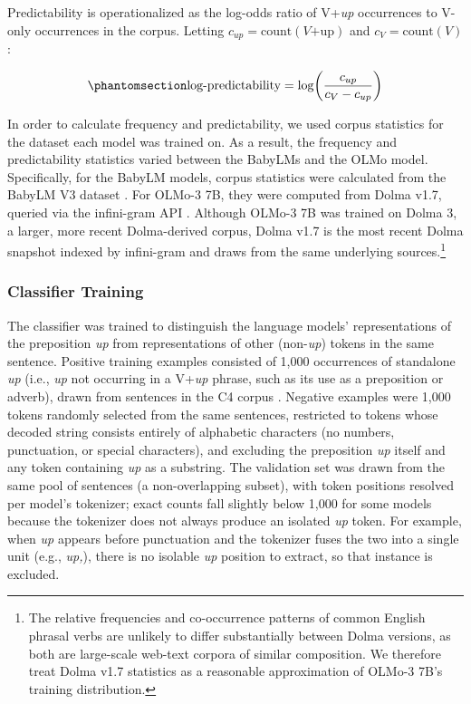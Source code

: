 \documentclass[11pt]{article}
\begin{document}
Predictability is operationalized as the log-odds ratio of V+\emph{up}
occurrences to V-only occurrences in the corpus. Letting
\(c_{up} = \text{count}(V\text{+up})\) and \(c_V = \text{count}(V)\):

\begin{equation}\phantomsection\label{eq-logit-predic}{\text{log-predictability} = \log\!\left(\frac{c_{up}}{c_V - c_{up}}\right)}\end{equation}

In order to calculate frequency and predictability, we used corpus
statistics for the dataset each model was trained on. As a result, the
frequency and predictability statistics varied between the BabyLMs and
the OLMo model. Specifically, for the BabyLM models, corpus statistics
were calculated from the BabyLM V3 dataset
\citep{charpentier2025babylm}. For OLMo-3 7B, they were computed from
Dolma v1.7, queried via the infini-gram API \citep{liu2024infini}.
Although OLMo-3 7B was trained on Dolma 3, a larger, more recent
Dolma-derived corpus, Dolma v1.7 is the most recent Dolma snapshot
indexed by infini-gram and draws from the same underlying
sources.\footnote{The relative frequencies and co-occurrence patterns of
  common English phrasal verbs are unlikely to differ substantially
  between Dolma versions, as both are large-scale web-text corpora of
  similar composition. We therefore treat Dolma v1.7 statistics as a
  reasonable approximation of OLMo-3 7B's training distribution.}

\subsubsection{Classifier Training}\label{classifier-training}

The classifier was trained to distinguish the language models'
representations of the preposition \emph{up} from representations of
other (non-\emph{up}) tokens in the same sentence. Positive training
examples consisted of 1,000 occurrences of standalone \emph{up} (i.e.,
\emph{up} not occurring in a V+\emph{up} phrase, such as its use as a
preposition or adverb), drawn from sentences in the C4 corpus
\citep{raffel2020exploring}. Negative examples were 1,000 tokens
randomly selected from the same sentences, restricted to tokens whose
decoded string consists entirely of alphabetic characters (no numbers,
punctuation, or special characters), and excluding the preposition
\emph{up} itself and any token containing \emph{up} as a substring. The
validation set was drawn from the same pool of sentences (a
non-overlapping subset), with token positions resolved per model's
tokenizer; exact counts fall slightly below 1,000 for some models
because the tokenizer does not always produce an isolated \emph{up}
token. For example, when \emph{up} appears before punctuation and the
tokenizer fuses the two into a single unit (e.g., \emph{up,}), there is
no isolable \emph{up} position to extract, so that instance is excluded.
\end{document}
